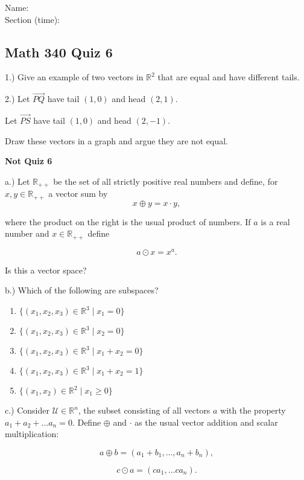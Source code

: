 \documentclass{article}
\begin{document}
Name:\\
\medskip
Section (time):

\subsection*{Math 340 Quiz 6}

1.) Give an example of two vectors in $\mathbb{R}^2$ that are equal and have different tails. 

2.) Let $\vec{PQ}$ have tail $(1,0)$ and head $(2,1)$.

Let $\vec{PS}$ have tail $(1,0)$ and head $(2,-1)$.

Draw these vectors in a graph and argue they are not equal.


\pagebreak

\textbf{Not Quiz 6}

a.) Let $\mathbb{R}_{++}$ be the set of all strictly positive real numbers and define, for $x,y\in \mathbb{R}_{++}$ a vector sum by $$x \oplus y = x \cdot y,$$

where the product on the right is the usual product of numbers. If $a$ is a real number and $x\in\mathbb{R}_{++}$ define

$$a \odot x = x^a.$$

Is this a vector space?

b.) Which of the following are subspaces?

\begin{enumerate}
\item $\{ (x_1, x_2, x_3)\in \mathbb{R}^3 \mid x_1 = 0\}$
\item $\{ (x_1, x_2, x_3)\in \mathbb{R}^3 \mid x_2 = 0\}$
\item $\{ (x_1, x_2, x_3)\in \mathbb{R}^3 \mid x_1+x_2 = 0\}$
\item $\{ (x_1, x_2, x_3)\in \mathbb{R}^3 \mid x_1+x_2 = 1\}$
\item $\{ (x_1, x_2)\in \mathbb{R}^2 \mid x_1 \geq 0\}$




\end{enumerate}

c.) Consider $\mathcal{U}\in \mathbb{R}^n$, the subset consisting of all vectors $a$ with the property $a_1+a_2+\dots a_n=0$. Define $\oplus$ and $\cdot$ as the usual vector addition and scalar multiplication:

$$a\oplus b = (a_1+b_1, \dots, a_n + b_n),$$

$$c\odot a = (ca_1, \dots ca_n).$$
\end{document}
